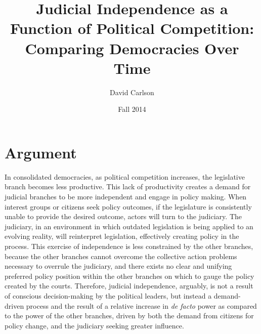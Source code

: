 \documentclass[12pt]{article}
\title{Judicial Independence as a Function of Political Competition: Comparing Democracies Over Time}
\author{David Carlson}
\date{Fall 2014}
\begin{document}
\maketitle

\section*{Argument}
In consolidated democracies, as political competition increases, the legislative branch becomes less productive. This lack of productivity creates a demand for judicial branches to be more independent and engage in policy making. When interest groups or citizens seek policy outcomes, if the legislature is consistently unable to provide the desired outcome, actors will turn to the judiciary. The judiciary, in an environment in which outdated legislation is being applied to an evolving reality, will reinterpret legislation, effectively creating policy in the process. This exercise of independence is less constrained by the other branches, because the other branches cannot overcome the collective action problems necessary to overrule the judiciary, and there exists no clear and unifying preferred policy position within the other branches on which to gauge the policy created by the courts. Therefore, judicial independence, arguably, is not a result of conscious decision-making by the political leaders, but instead a demand-driven process and the result of a relative increase in \textit{de facto} power as compared to the power of the other branches, driven by both the demand from citizens for policy change, and the judiciary seeking greater influence.
\end{document}
